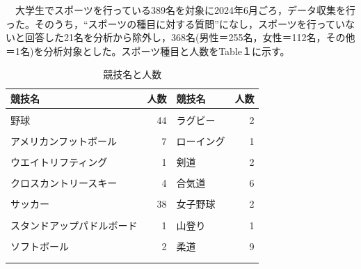\documentclass[12pt,a4paper,xelatex,ja=standard]{bxjsarticle}
\begin{document}
　大学生でスポーツを行っている389名を対象に2024年6月ごろ，データ収集を行った。そのうち，``スポーツの種目に対する質問''になし，スポーツを行っていないと回答した21名を分析から除外し，368名(男性＝255名，女性＝112名，その他＝1名)を分析対象とした。スポーツ種目と人数をTable１に示す。

\begin{table}[!h]
\centering
\caption{\label{tab:unnamed-chunk-2}競技名と人数}
\centering
\begin{tabular}[t]{lrlr}
\toprule
競技名 & 人数 & 競技名 & 人数\\
\midrule
\cellcolor[HTML]{F5F5F5}{テニス} & \cellcolor[HTML]{F5F5F5}{13} & \cellcolor[HTML]{F5F5F5}{ライフセービング} & \cellcolor[HTML]{F5F5F5}{1}\\
野球 & 44 & ラグビー & 2\\
\cellcolor[HTML]{F5F5F5}{アイスホッケー} & \cellcolor[HTML]{F5F5F5}{5} & \cellcolor[HTML]{F5F5F5}{レスリング} & \cellcolor[HTML]{F5F5F5}{6}\\
アメリカンフットボール & 7 & ローイング & 1\\
\cellcolor[HTML]{F5F5F5}{アルペンスキー} & \cellcolor[HTML]{F5F5F5}{3} & \cellcolor[HTML]{F5F5F5}{体操} & \cellcolor[HTML]{F5F5F5}{6}\\
\addlinespace
ウエイトリフティング & 1 & 剣道 & 2\\
\cellcolor[HTML]{F5F5F5}{オーストラリアンフットボール} & \cellcolor[HTML]{F5F5F5}{6} & \cellcolor[HTML]{F5F5F5}{卓球} & \cellcolor[HTML]{F5F5F5}{10}\\
クロスカントリースキー & 4 & 合気道 & 6\\
\cellcolor[HTML]{F5F5F5}{ゴルフ} & \cellcolor[HTML]{F5F5F5}{5} & \cellcolor[HTML]{F5F5F5}{女子サーブル} & \cellcolor[HTML]{F5F5F5}{1}\\
サッカー & 38 & 女子野球 & 2\\
\addlinespace
\cellcolor[HTML]{F5F5F5}{ランニング} & \cellcolor[HTML]{F5F5F5}{1} & \cellcolor[HTML]{F5F5F5}{射撃} & \cellcolor[HTML]{F5F5F5}{1}\\
スタンドアップパドルボード & 1 & 山登り & 1\\
\cellcolor[HTML]{F5F5F5}{ソフトテニス} & \cellcolor[HTML]{F5F5F5}{45} & \cellcolor[HTML]{F5F5F5}{新体操} & \cellcolor[HTML]{F5F5F5}{2}\\
ソフトボール & 2 & 柔道 & 9\\
\cellcolor[HTML]{F5F5F5}{ダンス} & \cellcolor[HTML]{F5F5F5}{1} & \cellcolor[HTML]{F5F5F5}{水泳} & \cellcolor[HTML]{F5F5F5}{7}\\
\addlinespace

\end{tabular}
\end{table}
\end{document}
